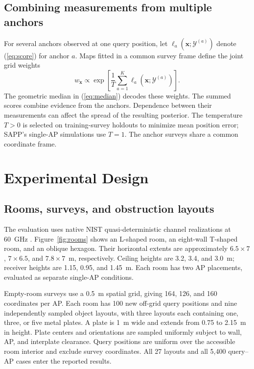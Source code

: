 \documentclass[conference]{IEEEtran}
\newcommand{\Y}{\mathcal Y}
\begin{document}
\subsection{Combining measurements from multiple anchors}
\label{sec:fusion}
For several anchors observed at one query position, let $\ell_a(\bm x;\Y^{(a)})$ denote (\ref{eq:score}) for anchor $a$. Maps fitted in a common survey frame define the joint grid weights
\begin{equation}
w_{\bm x}\propto\exp\left[\frac{1}{T}\sum_{a=1}^{K}\ell_a(\bm x;\Y^{(a)})\right].
\label{eq:fusion}
\end{equation}
The geometric median in (\ref{eq:median}) decodes these weights. The summed scores combine evidence from the anchors. Dependence between their measurements can affect the spread of the resulting posterior. The temperature $T>0$ is selected on training-survey holdouts to minimize mean position error; SAPP's single-AP simulations use $T=1$. The anchor surveys share a common coordinate frame.

\section{Experimental Design}
\subsection{Rooms, surveys, and obstruction layouts}
The evaluation uses native NIST quasi-deterministic channel realizations at 60~GHz \cite{lecci2020qd,nistqdsoftware}. Figure~\ref{fig:rooms} shows an L-shaped room, an eight-wall T-shaped room, and an oblique hexagon. Their horizontal extents are approximately \(6.5\times7\), \(7\times6.5\), and \(7.8\times7\)~m, respectively. Ceiling heights are 3.2, 3.4, and 3.0~m; receiver heights are 1.15, 0.95, and 1.45~m. Each room has two AP placements, evaluated as separate single-AP conditions.

Empty-room surveys use a 0.5~m spatial grid, giving 164, 126, and 160 coordinates per AP. Each room has 100 new off-grid query positions and nine independently sampled object layouts, with three layouts each containing one, three, or five metal plates. A plate is 1~m wide and extends from 0.75 to 2.15~m in height. Plate centers and orientations are sampled uniformly subject to wall, AP, and interplate clearance. Query positions are uniform over the accessible room interior and exclude survey coordinates. All 27 layouts and all 5,400 query--AP cases enter the reported results.
\end{document}
